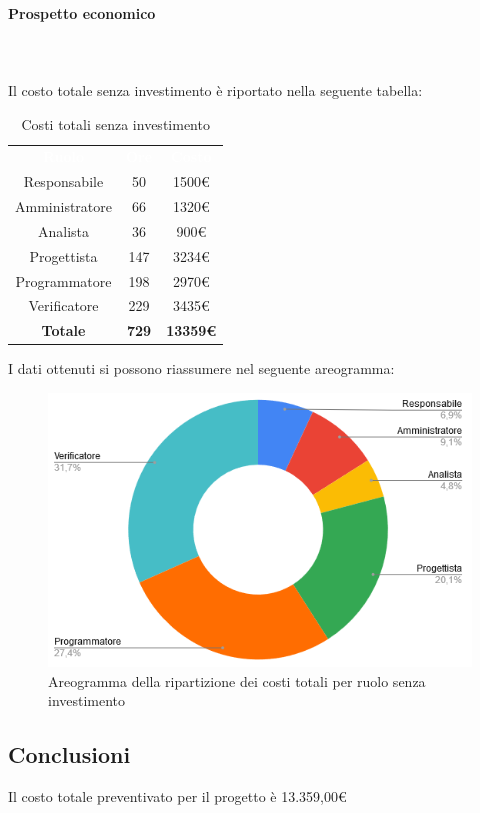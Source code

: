 \paragraph{Prospetto economico} \mbox{} \\ \mbox{} \\
Il costo totale senza investimento è riportato nella seguente tabella:

\begin{table}[H]
\centering\renewcommand{\arraystretch}{1.5}
\caption{Costi totali senza investimento}
\vspace{0.2cm}
\begin{tabular}{ c | c | c  }
\rowcolor{redafk}
\textcolor{white}{\textbf{Ruolo}} & \textcolor{white}{\textbf{Ore}} & 
\textcolor{white}{\textbf{Costo}}  \\
Responsabile & 50 & 1500€ \\
Amministratore & 66 & 1320€ \\
Analista & 36 & 900€ \\
Progettista	& 147 & 3234€ \\
Programmatore & 198 & 2970€  \\
Verificatore & 229 & 3435€  \\
\rowcolor{lastrowcolor}
\textbf{Totale} & \textbf{729} & \textbf{13359€}  \\
\end{tabular}
\end{table}

I dati ottenuti si possono riassumere nel seguente areogramma:
\begin{figure}[H]
\centering
\includegraphics[scale=0.60]{img/grafici/torta_tot_no_analisi.png}
\caption{Areogramma della ripartizione dei costi totali per ruolo senza investimento}
\end{figure}

\subsection{Conclusioni}
Il costo totale preventivato per il progetto è 13.359,00€